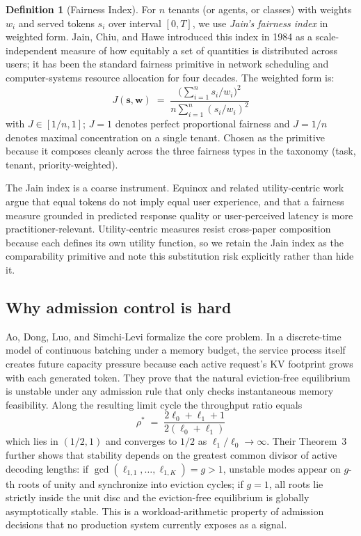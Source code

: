 \documentclass[11pt,letterpaper]{article}
\theoremstyle{definition}
\newtheorem{definition}{Definition}
\begin{document}
\begin{definition}[Fairness Index]
\label{def:fairness}
For $n$ tenants (or agents, or classes) with weights $w_i$ and served
tokens $s_i$ over interval $[0, T]$, we use \emph{Jain's fairness
index} \cite{jain1984fairness} in weighted form. Jain, Chiu, and Hawe
introduced this index in 1984 as a scale-independent measure of how
equitably a set of quantities is distributed across users; it has
been the standard fairness primitive in network scheduling and
computer-systems resource allocation for four decades. The weighted
form is:
%
\begin{equation}
J(\mathbf{s}, \mathbf{w}) \;=\; \frac{\bigl(\sum_{i=1}^{n} s_i / w_i\bigr)^2}{n \sum_{i=1}^{n} (s_i / w_i)^2}
\label{eq:jain}
\end{equation}
%
with $J \in [1/n, 1]$; $J = 1$ denotes perfect proportional fairness
and $J = 1/n$ denotes maximal concentration on a single tenant. Chosen
as the primitive because it composes cleanly across the three
fairness types in the taxonomy (task, tenant, priority-weighted).

The Jain index is a coarse instrument. Equinox \cite{lu2025equinox}
and related utility-centric work argue that equal tokens do not imply
equal user experience, and that a fairness measure grounded in
predicted response quality or user-perceived latency is more
practitioner-relevant. Utility-centric measures resist cross-paper
composition because each defines its own utility function, so we
retain the Jain index as the comparability primitive and note this
substitution risk explicitly rather than hide it.
\end{definition}

\subsection{Why admission control is hard}
\label{sec:whyhard}

Ao, Dong, Luo, and Simchi-Levi \cite{ao2026sic} formalize the core
problem. In a discrete-time model of continuous batching under a memory
budget, the service process itself creates future capacity pressure
because each active request's KV footprint grows with each generated
token. They prove that the natural eviction-free equilibrium is
unstable under any admission rule that only checks instantaneous
memory feasibility. Along the resulting limit cycle the throughput
ratio equals
%
\begin{equation}
\rho^{\ast} \;=\; \frac{2\ell_0 + \ell_1 + 1}{2(\ell_0 + \ell_1)}
\label{eq:throughput-bound}
\end{equation}
%
which lies in $(1/2, 1)$ and converges to $1/2$ as
$\ell_1/\ell_0 \to \infty$. Their Theorem~3 further shows that
stability depends on the greatest common divisor of active decoding
lengths: if $\gcd(\ell_{1,1}, \dots, \ell_{1,K}) = g > 1$, unstable
modes appear on $g$-th roots of unity and synchronize into eviction
cycles; if $g = 1$, all roots lie strictly inside the unit disc and
the eviction-free equilibrium is globally asymptotically stable. This
is a workload-arithmetic property of admission decisions that no
production system currently exposes as a signal.
\end{document}

